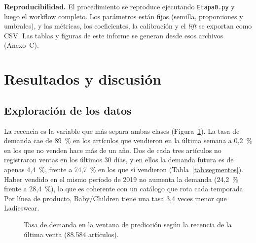 \documentclass[
  journal=largetwo,
  manuscript=Laboratorio-Numero-02,
  year=2026,
  volume=1
]{cup-journal}
\newcommand{\datos}[1]{fig/data/#1}
\begin{document}
\textbf{Reproducibilidad.} El procedimiento se reproduce ejecutando \texttt{Etapa0.py} y luego el workflow completo. Los parámetros están fijos (semilla, proporciones y umbrales), y las métricas, los coeficientes, la calibración y el \textit{lift} se exportan como CSV. Las tablas y figuras de este informe se generan desde esos archivos (Anexo~C).

\section{Resultados y discusión}

\subsection{Exploración de los datos}

La recencia es la variable que más separa ambas clases (Figura~\ref{fig:recencia}). La tasa de demanda cae de 89~\% en los artículos que vendieron en la última semana a 0,2~\% en los que no venden hace más de un año. Dos de cada tres artículos no registraron ventas en los últimos 30 días, y en ellos la demanda futura es de apenas 4,4~\%, frente a 74,7~\% en los que sí vendieron (Tabla~\ref{tab:segmentos}). Haber vendido en el mismo período de 2019 no aumenta la demanda (24,2~\% frente a 28,4~\%), lo que es coherente con un catálogo que rota cada temporada. Por línea de producto, Baby/Children tiene una tasa 3,4 veces menor que Ladieswear.

\begin{figure}[!ht]
\centering
{}
\caption{Tasa de demanda en la ventana de predicción según la recencia de la última venta (88.584 artículos).}
\label{fig:recencia}
\end{figure}
\end{document}
